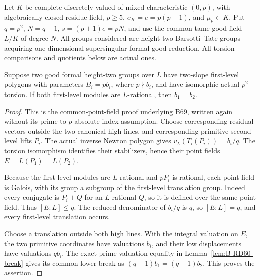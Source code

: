 Let \(K\) be complete discretely valued of mixed characteristic
\((0,p)\), with algebraically closed residue field,
\(p\ge5\), \(e_K=e=p(p-1)\), and \(\mu_p\subset K\).
Put \(q=p^2\), \(N=q-1\), \(s=(p+1)e=pN\), and use
the common tame good field \(L/K\) of degree \(N\).
All groups considered are height-two Barsotti--Tate groups
acquiring one-dimensional supersingular formal good reduction.
All torsion comparisons and quotients below are actual ones.

\begin{lemma}
\label{lem:B-RD83-tame}
Suppose two good formal height-two groups over \(L\) have
two-slope first-level polygons with parameters \(B_i=pb_i\),
where \(p\nmid b_i\), and have isomorphic actual
\(p^2\)-torsion. If both first-level modules are
\(L\)-rational, then \(b_1=b_2\).
\end{lemma}
\begin{proof}
This is the common-point-field proof underlying B69, written
again without its prime-to-\(p\) absolute-index assumption.
Choose corresponding residual vectors outside the two
canonical high lines, and corresponding primitive
second-level lifts \(P_i\). The actual inverse Newton
polygon gives \(v_L(T_i(P_i))=b_i/q\). The torsion
isomorphism identifies their stabilizers, hence their
point fields \(E=L(P_1)=L(P_2)\).

Because the first-level modules are \(L\)-rational and
\(pP_i\) is rational, each point field is Galois, with
its group a subgroup of the first-level translation
group. Indeed every conjugate is \(P_i+Q\) for an
\(L\)-rational \(Q\), so it is defined over the same
point field. Thus \([E:L]\le q\). The reduced denominator
of \(b_i/q\) is \(q\), so \([E:L]=q\), and every
first-level translation occurs.

Choose a translation outside both high lines. With the
integral valuation on \(E\), the two primitive coordinates
have valuations \(b_i\), and their low displacements have
valuations \(qb_i\). The exact prime-valuation equality
in Lemma~\ref{lem:B-RD60-break} gives its common lower
break as \((q-1)b_1=(q-1)b_2\). This proves the assertion.
\end{proof}

